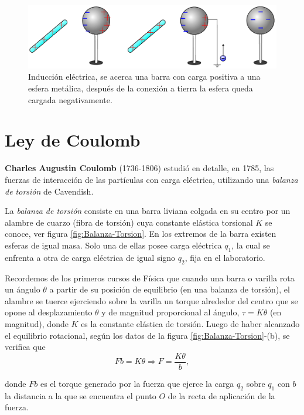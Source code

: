 \begin{enumerate}
\begin{figure}[H]
    \centering
    \includegraphics[scale = 0.5]{Figuras/Induccion-2.pdf}
    \caption{Inducción eléctrica, se acerca una barra con carga positiva a una esfera metálica, después de la conexión a tierra la esfera queda cargada negativamente.}
    \label{fig:Induccion-2}
\end{figure}
\end{enumerate}

\section{Ley de Coulomb}

\textbf{Charles Augustin Coulomb} (1736-1806) estudió en detalle, en 1785, las fuerzas de interacción de las partículas con carga eléctrica, utilizando una \textit{balanza de torsión} de Cavendish.

La \textit{balanza de torsión} consiste en una barra liviana colgada en su centro por un alambre de cuarzo (fibra de torsión) cuya constante elástica torsional $K$ se conoce, ver figura \ref{fig:Balanza-Torsion}.
En los extremos de la barra existen esferas de igual masa. Solo una de ellas posee carga eléctrica $q_1$, la cual se enfrenta a otra de carga eléctrica de igual signo $q_2$, fija en el laboratorio. 

Recordemos de los primeros cursos de Física que cuando una barra o varilla rota un ángulo $\theta$ a partir de su posición de equilibrio (en una balanza de torsión), el alambre se tuerce ejerciendo sobre la varilla un torque alrededor del centro que se opone al desplazamiento $\theta$ y de magnitud proporcional al ángulo, $\tau = K \theta$ (en magnitud), donde $K$ es la constante elástica de torsión. Luego de haber alcanzado el equilibrio rotacional, según los datos de la figura \ref{fig:Balanza-Torsion}-(b), se verifica que
$$Fb = K \theta \Rightarrow F = \frac{K\theta}{b},$$

donde $F b$ es el torque generado por la fuerza que ejerce la carga $q_2$ sobre $q_1$ con $b$  la distancia a la que se encuentra el punto $O$ de la recta de aplicación de la fuerza.

